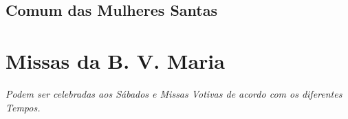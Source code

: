\subsection{Comum das Mulheres Santas}






\section{Missas da B. V. Maria}

\textit{Podem ser celebradas aos Sábados e Missas Votivas de acordo com os diferentes Tempos.}







